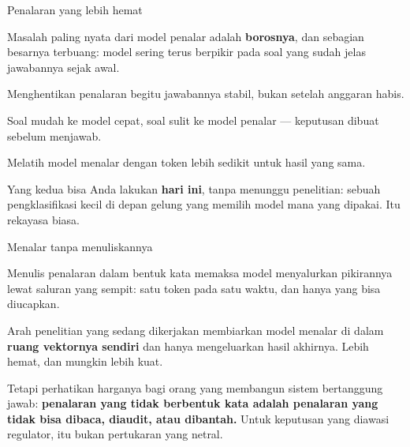\documentclass[aspectratio=169,11pt,t]{beamer}
\begin{document}

\begin{frame}[shrink=25]{Penalaran yang lebih hemat}
{\fontsize{9.4}{12.6}\selectfont\color{fg2}Masalah paling nyata dari model penalar adalah \textbf{borosnya}, dan sebagian besarnya terbuang: model sering terus berpikir pada soal yang sudah jelas jawabannya sejak awal.\par}\vskip 4pt
\begin{minipage}[t]{0.3253\textwidth}
\begin{icard}
Menghentikan penalaran begitu jawabannya stabil, bukan setelah anggaran habis.
\end{icard}
\end{minipage}%
\hfill
\begin{minipage}[t]{0.3253\textwidth}
\begin{icard}
Soal mudah ke model cepat, soal sulit ke model penalar --- keputusan dibuat sebelum menjawab.
\end{icard}
\end{minipage}%
\hfill
\begin{minipage}[t]{0.3253\textwidth}
\begin{icard}
Melatih model menalar dengan token lebih sedikit untuk hasil yang sama.
\end{icard}
\end{minipage}%
{\fontsize{9.4}{12.6}\selectfont\color{fg2}Yang kedua bisa Anda lakukan \textbf{hari ini}, tanpa menunggu penelitian: sebuah pengklasifikasi kecil di depan gelung yang memilih model mana yang dipakai. Itu rekayasa biasa.\par}\vskip 4pt
\end{frame}

\begin{frame}[shrink=25]{Menalar tanpa menuliskannya}
{\fontsize{9.4}{12.6}\selectfont\color{fg2}Menulis penalaran dalam bentuk kata memaksa model menyalurkan pikirannya lewat saluran yang sempit: satu token pada satu waktu, dan hanya yang bisa diucapkan.\par}\vskip 4pt
{\fontsize{9.4}{12.6}\selectfont\color{fg2}Arah penelitian yang sedang dikerjakan membiarkan model menalar di dalam \textbf{ruang vektornya sendiri} dan hanya mengeluarkan hasil akhirnya. Lebih hemat, dan mungkin lebih kuat.\par}\vskip 4pt
\begin{iband}[signal]
Tetapi perhatikan harganya bagi orang yang membangun sistem bertanggung jawab: \textbf{penalaran yang tidak berbentuk kata adalah penalaran yang tidak bisa dibaca, diaudit, atau dibantah.} Untuk keputusan yang diawasi regulator, itu bukan pertukaran yang netral.
\end{iband}
\end{frame}
\end{document}
